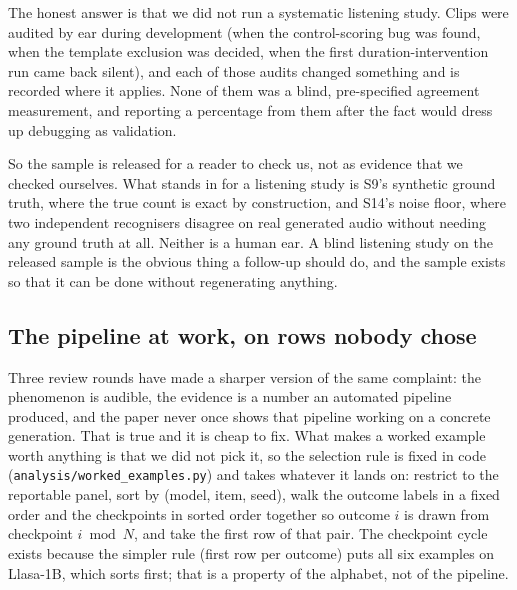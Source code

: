 \documentclass[11pt]{article}
\begin{document}
The honest answer is that we did not run a systematic listening study. Clips were
audited by ear during development (when the control-scoring bug was found,
when the template exclusion was decided, when the first duration-intervention
run came back silent), and each of those audits changed something and is
recorded where it applies. None of them was a blind, pre-specified agreement
measurement, and reporting a percentage from them after the fact would dress up
debugging as validation.

So the sample is released for a reader to check us, not as evidence that we
checked ourselves. What stands in for a listening study is S9's synthetic ground
truth, where the true count is exact by construction, and S14's noise floor,
where two independent recognisers disagree on real generated audio without
needing any ground truth at all. Neither is a human ear. A blind listening study
on the released sample is the obvious thing a follow-up should do, and the sample
exists so that it can be done without regenerating anything.

\subsection{The pipeline at work, on rows nobody chose}

Three review rounds have made a sharper version of the same complaint: the
phenomenon is audible, the evidence is a number an automated pipeline produced,
and the paper never once shows that pipeline working on a concrete generation.
That is true and it is cheap to fix. What makes a worked example worth anything
is that we did not pick it, so the selection rule is fixed in code
(\texttt{analysis/worked\_examples.py}) and takes whatever it lands on: restrict
to the reportable panel, sort by (model, item, seed), walk the outcome labels in
a fixed order and the checkpoints in sorted order together so outcome $i$ is
drawn from checkpoint $i \bmod N$, and take the first row of that pair. The
checkpoint cycle exists because the simpler rule (first row per outcome)
puts all six examples on Llasa-1B, which sorts first; that is a property of the
alphabet, not of the pipeline.
\end{document}
